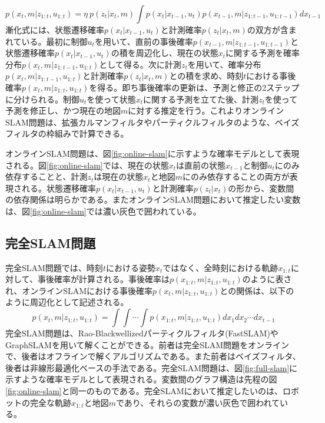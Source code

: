 \documentclass[dvipdfmx,a4paper]{jsarticle}
\begin{document}
\begin{equation}
	p(x_t, m | z_{1 : t}, u_{1 : t}) = \eta \ p(z_t | x_t, m) \int p(x_t | x_{t - 1}, u_t) p(x_{t - 1}, m | z_{1 : t - 1}, u_{1 : t - 1}) dx_{t - 1}
\end{equation}
漸化式には、状態遷移確率$p(x_t | x_{t - 1}, u_t)$と計測確率$p(z_t | x_t, m)$の双方が含まれている。最初に制御$u_t$を用いて、直前の事後確率$p(x_{t - 1}, m | z_{1 : t - 1}, u_{1 : t - 1})$と状態遷移確率$p(x_t | x_{t - 1}, u_t)$の積を周辺化し、現在の状態$x_t$に関する予測を確率分布$p(x_t, m | z_{1 : t - 1}, u_{1 : t})$として得る。次に計測$z_t$を用いて、確率分布$p(x_t, m | z_{1 : t - 1}, u_{1 : t})$と計測確率$p(z_t | x_t, m)$との積を求め、時刻$t$における事後確率$p(x_t, m | z_{1 : t}, u_{1 : t})$を得る。即ち事後確率の更新は、予測と修正の2ステップに分けられる。制御$u_t$を使って状態$x_t$に関する予測を立てた後、計測$z_t$を使って予測を修正し、かつ現在の地図$m$に対する推定を行う。これよりオンラインSLAM問題は、拡張カルマンフィルタやパーティクルフィルタのような、ベイズフィルタの枠組みで計算できる。\newline

オンラインSLAM問題は、図\ref{fig:online-slam}に示すような確率モデルとして表現される。図\ref{fig:online-slam}では、現在の状態$x_t$は直前の状態$x_{t - 1}$と制御$u_t$にのみ依存することと、計測$z_t$は現在の状態$x_t$と地図$m$にのみ依存することの両方が表現される。状態遷移確率$p(x_t | x_{t - 1}, u_t)$と計測確率$p(z_t | x_t)$の形から、変数間の依存関係は明らかである。またオンラインSLAM問題において推定したい変数は、図\ref{fig:online-slam}では濃い灰色で囲われている。

\subsection{完全SLAM問題}
完全SLAM問題では、時刻$t$における姿勢$x_t$ではなく、全時刻における軌跡$x_{1 : t}$に対して、事後確率が計算される。事後確率は$p(x_{1 : t}, m | z_{1 : t}, u_{1 : t})$のように表され、オンラインSLAMにおける事後確率$p(x_t, m | z_{1 : t}, u_{1 : t})$との関係は、以下のように周辺化として記述される。
\begin{equation}
	p(x_t, m | z_{1 : t}, u_{1 : t}) = \int \int \cdots \int p(x_{1 : t}, m | z_{1 : t}, u_{1 : t}) dx_1 dx_2 \cdots dx_{t - 1}
\end{equation}
完全SLAM問題は、Rao-Blackwellizedパーティクルフィルタ(FastSLAM)やGraphSLAMを用いて解くことができる。前者は完全SLAM問題をオンラインで、後者はオフラインで解くアルゴリズムである。また前者はベイズフィルタ、後者は非線形最適化ベースの手法である。完全SLAM問題は、図\ref{fig:full-slam}に示すような確率モデルとして表現される。変数間のグラフ構造は先程の図\ref{fig:online-slam}と同一のものである。完全SLAMにおいて推定したいのは、ロボットの完全な軌跡$x_{1 : t}$と地図$m$であり、それらの変数が濃い灰色で囲われている。
\end{document}
